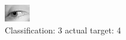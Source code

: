 \begin{figure}[h!]
\begin{center}
\includegraphics[width=0.60\columnwidth]{figures/ID3034_class_3_target_4.png}
\end{center}
\caption{ Classification: 3 actual target: 4}
\label{fig:ID3034_class_3_target_4}
\end{figure}
